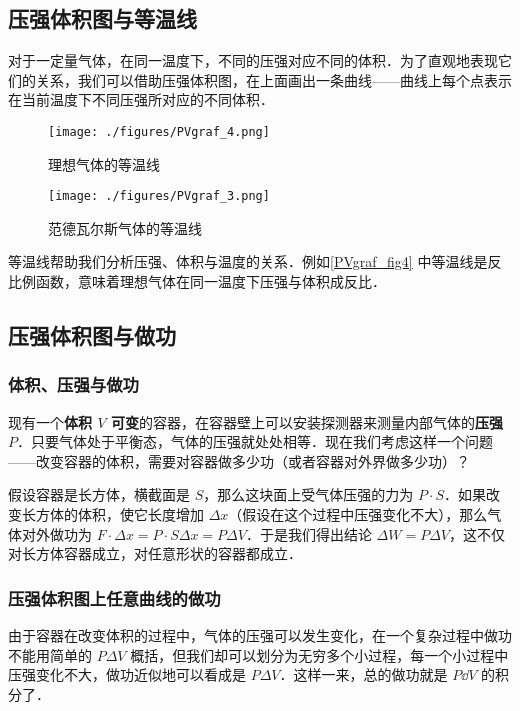 
\begin{issues}
\issueDraft
\end{issues}


\subsection{压强体积图与等温线}
对于一定量气体，在同一温度下，不同的压强对应不同的体积．为了直观地表现它们的关系，我们可以借助压强体积图，在上面画出一条曲线——曲线上每个点表示在当前温度下不同压强所对应的不同体积．
\begin{figure}[ht]
\centering
\texttt{[image: ./figures/PVgraf\_4.png]}
\caption{理想气体的等温线} \label{PVgraf_fig4}
\end{figure}
\begin{figure}[ht]
\centering
\texttt{[image: ./figures/PVgraf\_3.png]}
\caption{范德瓦尔斯气体的等温线} \label{PVgraf_fig3}
\end{figure}

等温线帮助我们分析压强、体积与温度的关系．例如\autoref{PVgraf_fig4} 中等温线是反比例函数，意味着理想气体在同一温度下压强与体积成反比．

\subsection{压强体积图与做功}

\subsubsection{体积、压强与做功}
现有一个\textbf{体积 $V$ 可变}的容器，在容器壁上可以安装探测器来测量内部气体的\textbf{压强 $P$}．只要气体处于平衡态，气体的压强就处处相等．现在我们考虑这样一个问题——改变容器的体积，需要对容器做多少功（或者容器对外界做多少功）？

假设容器是长方体，横截面是 $S$，那么这块面上受气体压强的力为 $P\cdot S$．如果改变长方体的体积，使它长度增加 $\Delta x$（假设在这个过程中压强变化不大），那么气体对外做功为 $F\cdot \Delta x=P\cdot S\Delta x=P\Delta V$．于是我们得出结论 $\Delta W=P\Delta V$，这不仅对长方体容器成立，对任意形状的容器都成立．
\subsubsection{压强体积图上任意曲线的做功}
由于容器在改变体积的过程中，气体的压强可以发生变化，在一个复杂过程中做功不能用简单的 $P\Delta V$ 概括，但我们却可以划分为无穷多个小过程，每一个小过程中压强变化不大，做功近似地可以看成是 $P\Delta V$．这样一来，总的做功就是 $P\dd V$ 的积分了．

